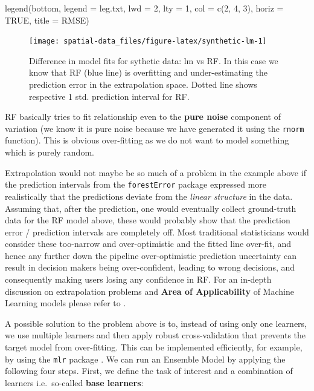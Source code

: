 \documentclass[
  graybox,natbib,nospthms]{svmono}
\newenvironment{Shaded}{\begin{snugshade}}{\end{snugshade}}
\newcommand{\AttributeTok}[1]{\textcolor[rgb]{0.61,0.61,0.61}{#1}}
\newcommand{\ConstantTok}[1]{\textcolor[rgb]{0,0,0}{#1}}
\newcommand{\DecValTok}[1]{\textcolor[rgb]{0.06,0.06,0.06}{#1}}
\newcommand{\FunctionTok}[1]{\textcolor[rgb]{0,0,0}{#1}}
\newcommand{\NormalTok}[1]{#1}
\newcommand{\StringTok}[1]{\textcolor[rgb]{0.5,0.5,0.5}{#1}}
\begin{document}
\begin{Shaded}
\begin{Highlighting}[]
\FunctionTok{legend}\NormalTok{(}\StringTok{\textquotesingle{}bottom\textquotesingle{}}\NormalTok{, }\AttributeTok{legend =}\NormalTok{ leg.txt, }\AttributeTok{lwd =} \DecValTok{2}\NormalTok{, }\AttributeTok{lty =} \DecValTok{1}\NormalTok{, }\AttributeTok{col =} \FunctionTok{c}\NormalTok{(}\DecValTok{2}\NormalTok{, }\DecValTok{4}\NormalTok{, }\DecValTok{3}\NormalTok{), }\AttributeTok{horiz =} \ConstantTok{TRUE}\NormalTok{, }\AttributeTok{title =} \StringTok{\textquotesingle{}RMSE\textquotesingle{}}\NormalTok{)}
\end{Highlighting}
\end{Shaded}

\begin{figure}

{\centering \texttt{[image: spatial-data\_files/figure-latex/synthetic-lm-1]} 

}

\caption{Difference in model fits for sythetic data: lm vs RF. In this case we know that RF (blue line) is overfitting and under-estimating the prediction error in the extrapolation space. Dotted line shows respective 1 std. prediction interval for RF.}\label{fig:synthetic-lm}
\end{figure}

RF basically tries to fit relationship even to the \textbf{pure noise} component of variation
(we know it is pure noise because we have generated it using the \texttt{rnorm} function).
This is obvious over-fitting as we do not want to model something which is purely random.

Extrapolation would not maybe be so much of a problem in the example above if
the prediction intervals from the \texttt{forestError} package expressed more
realistically that the predictions deviate from the \emph{linear structure} in the
data. Assuming that, after the prediction, one would eventually collect
ground-truth data for the RF model above, these would probably show that the
prediction error / prediction intervals are completely off. Most traditional
statisticians would consider these too-narrow and over-optimistic and the
fitted line over-fit, and hence any further down the pipeline over-optimistic
prediction uncertainty can result in decision makers being over-confident,
leading to wrong decisions, and consequently making users losing any confidence in RF.
For an in-depth discussion on extrapolation problems and \textbf{Area of Applicability}
of Machine Learning models please refer to \citet{meyerPebesma2020}.

A possible solution to the problem above is to, instead of using only one
learners, we use multiple learners and then apply robust cross-validation that
prevents the target model from over-fitting. This can be implemented efficiently,
for example, by using the \texttt{mlr} package \citep{bischl2016mlr}. We can run an Ensemble
Model by applying the following four steps. First, we define the task of interest
and a combination of learners i.e.~so-called \textbf{base learners}:
\end{document}
